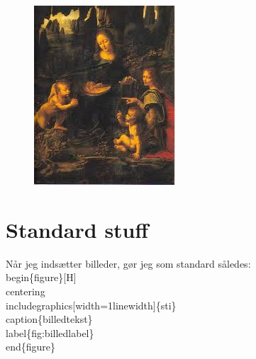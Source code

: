 \begin{figure}[H]
\includegraphics[width=1\linewidth]{billeder/madonna.jpeg}
\end{figure}

\section{Standard stuff}

Når jeg indsætter billeder, gør jeg som standard således:\\

\indent \bs begin\{figure\}[H]\\
\indent \bs centering\\
\indent \bs includegraphics[width=1\bs linewidth]\{sti\}\\
\indent \bs caption\{billedtekst\}\\
\indent \bs label\{fig:billedlabel\}\\
\indent \bs end\{figure\}\\

